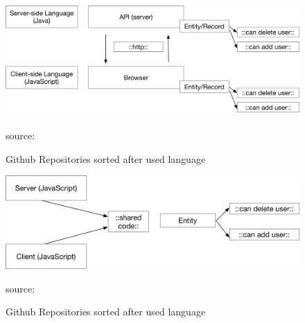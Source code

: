 \begin{figure}
	\centering
	\includegraphics[scale=0.5]{bilder/grundlagen/Entity1.png}
	\caption{Github Repositories sorted after used language} source:\cite{JS}
	\label{fig:JS}
\end{figure}

\begin{figure}
	\centering
	\includegraphics[scale=0.5]{bilder/grundlagen/Entity2.png}
	\caption{Github Repositories sorted after used language} source:\cite{JS}
	\label{fig:JS}
\end{figure}











